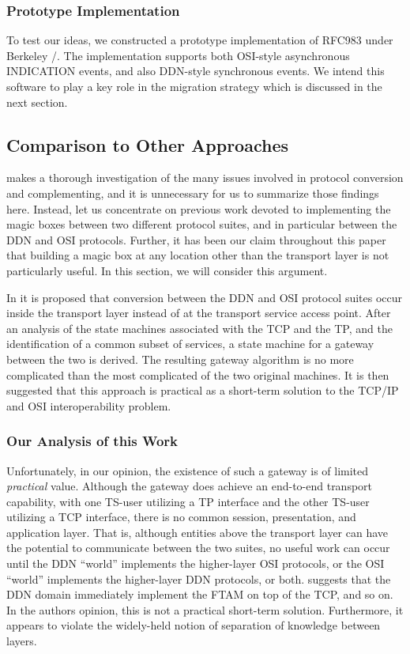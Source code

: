 \subsubsection	{Prototype Implementation}
To test our ideas,
we constructed a prototype implementation of RFC983 under Berkeley \unix/.
The implementation supports both OSI-style asynchronous {\sf INDICATION}
events,
and also DDN-style synchronous events.
We intend this software to play a key role in the migration strategy which is
discussed in the next section.

\subsection	{Comparison to Other Approaches}\label{comparison}
\cite{Protocol.Conversion} makes a thorough investigation of the many
issues involved in protocol conversion and complementing,
and it is unnecessary for us to summarize those findings here.
Instead, let us concentrate on previous work devoted to implementing the magic
boxes between two different protocol suites,
and in particular between the DDN and OSI protocols.
Further,
it has been our claim throughout this paper that building a magic box at any
location other than the transport layer is not particularly useful.
In this section,
we will consider this argument.

In \cite{TCP.convert.ISO}
it is proposed that conversion between the DDN and OSI protocol suites
occur inside the transport layer instead of at the transport service access
point.
After an analysis of the state machines associated with the TCP and the TP,
and the identification of a common subset of services,
a state machine for a gateway between the two is derived.
The resulting gateway algorithm is no more complicated than the most
complicated of the two original machines.
It is then suggested that this approach is practical as a short-term solution
to the TCP/IP and OSI interoperability problem.

\subsubsection	{Our Analysis of this Work}
Unfortunately,
in our opinion,
the existence of such a gateway is of limited {\em practical\/} value.
Although the gateway does achieve an end-to-end transport capability,
with one TS-user utilizing a TP interface and the other TS-user utilizing a
TCP interface,
there is no common session, presentation, and application layer.
That is,
although entities above the transport layer can have the potential to
communicate between the two suites,
no useful work can occur
until the DDN ``world'' implements the higher-layer OSI protocols,
or the OSI ``world'' implements the higher-layer DDN protocols,
or both.
\cite{TCP.convert.ISO} suggests that the DDN domain immediately implement
the FTAM on top of the TCP, and so on.
In the authors opinion,
this is not a practical short-term solution.
Furthermore,
it appears to violate the widely-held notion of separation of knowledge
between layers.


